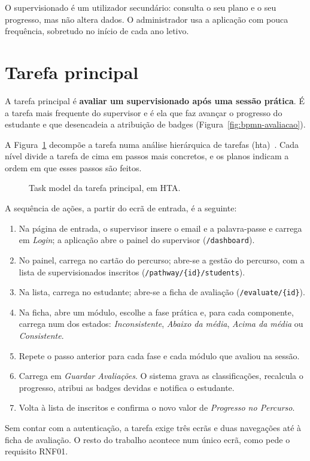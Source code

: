 O supervisionado é um utilizador secundário: consulta o seu plano e o seu progresso, mas não altera dados. O administrador usa a aplicação com pouca frequência, sobretudo no início de cada ano letivo.

\section{Tarefa principal}

A tarefa principal é \textbf{avaliar um supervisionado após uma sessão prática}. É a tarefa mais frequente do supervisor e é ela que faz avançar o progresso do estudante e que desencadeia a atribuição de badges (Figura~\ref{fig:bpmn-avaliacao}).

A Figura~\ref{fig:task-model} decompõe a tarefa numa análise hierárquica de tarefas (\gls{hta})~\citep{annett-hta}. Cada nível divide a tarefa de cima em passos mais concretos, e os planos indicam a ordem em que esses passos são feitos.

\begin{figure}[H]
    \centering
    \resizebox{\linewidth}{!}{}
    \caption{Task model da tarefa principal, em HTA.}
    \label{fig:task-model}
\end{figure}

A sequência de ações, a partir do ecrã de entrada, é a seguinte:

\begin{enumerate}
    \item Na página de entrada, o supervisor insere o email e a palavra-passe e carrega em \emph{Login}; a aplicação abre o painel do supervisor (\texttt{/dashboard}).
    \item No painel, carrega no cartão do percurso; abre-se a gestão do percurso, com a lista de supervisionados inscritos (\texttt{/pathway/\{id\}/students}).
    \item Na lista, carrega no estudante; abre-se a ficha de avaliação (\texttt{/evaluate/\{id\}}).
    \item Na ficha, abre um módulo, escolhe a fase prática e, para cada componente, carrega num dos estados: \emph{Inconsistente}, \emph{Abaixo da média}, \emph{Acima da média} ou \emph{Consistente}.
    \item Repete o passo anterior para cada fase e cada módulo que avaliou na sessão.
    \item Carrega em \emph{Guardar Avaliações}. O sistema grava as classificações, recalcula o progresso, atribui as badges devidas e notifica o estudante.
    \item Volta à lista de inscritos e confirma o novo valor de \emph{Progresso no Percurso}.
\end{enumerate}

Sem contar com a autenticação, a tarefa exige três ecrãs e duas navegações até à ficha de avaliação. O resto do trabalho acontece num único ecrã, como pede o requisito RNF01.
